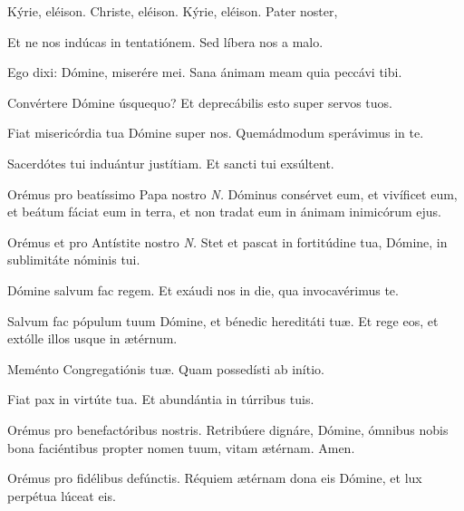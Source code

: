 
\label{preces}Kýrie, eléison. Christe, eléison. Kýrie, eléison. Pater noster, 


\vv Et ne nos indúcas in tentatiónem. \rr Sed líbera nos a malo.

\vv Ego dixi: Dómine, miserére mei. \rr Sana ánimam meam quia peccávi tibi.

\vv Convértere Dómine úsquequo?
\rr Et deprecábilis esto super servos tuos.

\vv Fiat misericórdia tua Dómine super nos.
\rr Quemádmodum sperávimus in te.

\vv Sacerdótes tui induántur justítiam.
\rr Et sancti tui exsúltent.

\vv Orémus pro beatíssimo Papa nostro \textit{N.}
\rr Dóminus consérvet eum, et vivíficet eum, et beátum fáciat eum in terra, et non tradat eum in ánimam inimicórum ejus.

\vv Orémus et pro Antístite nostro \textit{N.}
\rr Stet et pascat in fortitúdine tua, Dómine, in sublimitáte nóminis tui.


\vv Dómine salvum fac regem.
\rr Et exáudi nos in die, qua invocavérimus te.

\vv Salvum fac pópulum tuum Dómine, et bénedic hereditáti tuæ.
\rr Et rege eos, et extólle illos usque in ætérnum.

\vv Meménto Congregatiónis tuæ.
\rr Quam possedísti ab inítio.

\vv Fiat pax in virtúte tua.
\rr Et abundántia in túrribus tuis.

\vv Orémus pro benefactóribus nostris.
\rr Retribúere dignáre, Dómine, ómnibus nobis bona faciéntibus propter nomen tuum, vitam ætérnam. Amen.

\vv Orémus pro fidélibus defún\-ctis.
\rr Réquiem ætérnam dona eis Dómine, et lux perpétua lúceat eis.

